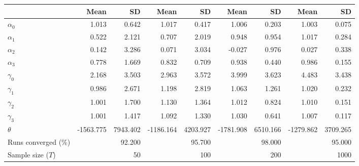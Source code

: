 
\begin{tabular}[t]{lrrrrrrrr}
\toprule
  & Mean & SD & Mean  & SD  & Mean   & SD   & Mean    & SD   \\
\midrule
$\alpha_{0}$ & 1.013 & 0.642 & 1.017 & 0.417 & 1.006 & 0.203 & 1.003 & 0.075\\
$\alpha_{1}$ & 0.522 & 2.121 & 0.707 & 2.019 & 0.948 & 0.954 & 1.017 & 0.284\\
$\alpha_{2}$ & 0.142 & 3.286 & 0.071 & 3.034 & -0.027 & 0.976 & 0.027 & 0.338\\
$\alpha_{3}$ & 0.778 & 1.669 & 0.832 & 0.709 & 0.938 & 0.440 & 0.986 & 0.155\\
$\gamma_{0}$ & 2.168 & 3.503 & 2.963 & 3.572 & 3.999 & 3.623 & 4.483 & 3.438\\
$\gamma_{1}$ & 0.986 & 2.671 & 1.198 & 2.819 & 1.063 & 1.261 & 1.020 & 0.232\\
$\gamma_{2}$ & 1.001 & 1.700 & 1.130 & 1.364 & 1.012 & 0.824 & 1.010 & 0.151\\
$\gamma_{3}$ & 1.001 & 1.417 & 1.092 & 1.330 & 1.030 & 0.641 & 1.007 & 0.117\\
$\theta$ & -1563.775 & 7943.402 & -1186.164 & 4203.927 & -1781.908 & 6510.166 & -1279.862 & 3709.265\\
Runs converged (\%) &  & 92.200 &  & 95.700 &  & 98.000 &  & 95.000\\
Sample size ($T$) &  & 50 &  & 100 &  & 200 &  & 1000\\
\bottomrule
\end{tabular}
